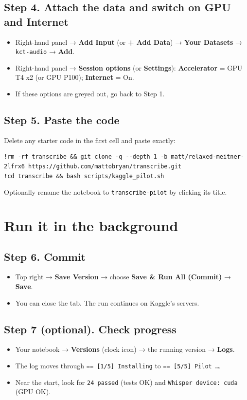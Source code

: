 \documentclass[11pt]{article}
\begin{document}
\subsection*{Step 4. Attach the data and switch on GPU and Internet}
\begin{itemize}
\item Right-hand panel → \textbf{Add Input} (or \textbf{+ Add Data}) → \textbf{Your Datasets} → \texttt{kct-audio} → \textbf{Add}.
\item Right-hand panel → \textbf{Session options} (or \textbf{Settings}): \textbf{Accelerator} = GPU T4 x2 (or GPU P100); \textbf{Internet} = On.
\item If these options are greyed out, go back to Step 1.
\end{itemize}

\subsection*{Step 5. Paste the code}
Delete any starter code in the first cell and paste exactly:
\begin{lstlisting}
!rm -rf transcribe && git clone -q --depth 1 -b matt/relaxed-meitner-2lfrx6 https://github.com/mattobryan/transcribe.git
!cd transcribe && bash scripts/kaggle_pilot.sh
\end{lstlisting}
Optionally rename the notebook to \texttt{transcribe-pilot} by clicking its title.

\section{Run it in the background}\label{run}

\subsection*{Step 6. Commit}
\begin{itemize}
\item Top right → \textbf{Save Version} → choose \textbf{Save \& Run All (Commit)} → \textbf{Save}.
\item You can close the tab. The run continues on Kaggle's servers.
\end{itemize}

\subsection*{Step 7 (optional). Check progress}
\begin{itemize}
\item Your notebook → \textbf{Versions} (clock icon) → the running version → \textbf{Logs}.
\item The log moves through \texttt{== [1/5] Installing} to \texttt{== [5/5] Pilot \ldots}.
\item Near the start, look for \texttt{24 passed} (tests OK) and \texttt{Whisper device: cuda} (GPU OK).
\end{itemize}
\end{document}
